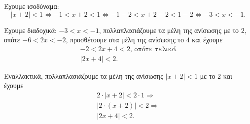 
\begin{alist}
\item Έχουμε ισοδύναμα:
\[|x + 2| < 1 \Leftrightarrow -1 < x + 2 < 1 \Leftrightarrow -1 - 2 < x + 2 - 2 < 1 - 2 \Leftrightarrow -3 < x < -1.\]

\item Έχουμε διαδοχικά:
$-3 < x < -1$, πολλαπλασιάζουμε τα μέλη της ανίσωσης με το $2$, οπότε
$-6 < 2x < -2$, προσθέτουμε στα μέλη της ανίσωσης το $4$ και έχουμε
\begin{gather*}
-2 < 2x + 4 < 2\text{, οπότε τελικά} \\
|2x + 4| < 2.
\end{gather*}

Εναλλακτικά, πολλαπλασιάζουμε τα μέλη της ανίσωσης $|x + 2| < 1$ με το $2$ και έχουμε
\begin{gather*}
2 \cdot |x + 2| < 2 \cdot 1\Rightarrow \\
|2 \cdot (x + 2)| < 2\Rightarrow \\
|2x + 4| < 2.
\end{gather*}
\end{alist}

